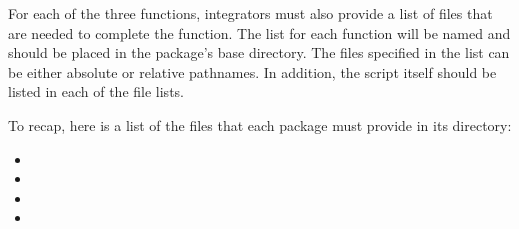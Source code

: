 For each of the three functions, integrators must also provide a list
of files that are needed to complete the function. The list for each
function will be named  and should be
placed in the package's base directory. The files specified in the
list can be either absolute or relative pathnames. In addition, the
 script itself should be listed in each of the file lists.

To recap, here is a list of the files that each package must provide
in its directory:

\begin{itemize}
\item {}
\item {}
\item {}
\item {}
\end{itemize}

